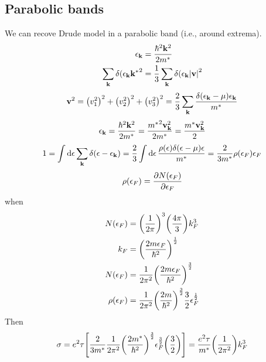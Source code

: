 \subsection{Parabolic bands} We can recove Drude model in a parabolic band (i.e., around extrema). 
\begin{align}
\epsilon_{\vb{k}} &= \frac{\hbar^2 \vb{k}^2 }{2m^*}\\
\sum_{\vb{k}} \delta (\epsilon_{\vb{k}} {\vb{k}^*}^2 &= \frac{1}{3} \sum_{\vb{k}} \delta (\epsilon_{\vb{k}} \abs{\vb{v}}^2
\end{align}
\begin{align}
\vb{v}^2= \qty(v_1^2)^2+\qty(v_2^2)^2+\qty(v_3^2)^2 = \frac{2}{3} \sum_{\vb{k}} \frac{\delta(\epsilon_{\vb{k}}-\mu)\epsilon_{\vb{k}}}{m^*}
\end{align}
\begin{align}
\epsilon_{\vb{k}} = \frac{\hbar^2 \vb{k}^2}{2m^*} = \frac{{m^*}^2 \vb{v}_{\vb{k}}^2}{2m^*} = \frac{{m^*} \vb{v}_{\vb{k}}^2}{2}
\end{align}
\begin{align}
1 = \int \dd{\epsilon } \sum_{\vb{k}} \delta(\epsilon - \epsilon_{\vb{k}}) = \frac{2}{3} \int \dd{\epsilon} \frac{\rho(\epsilon) \delta(\epsilon-\mu) \epsilon }{m^*}= \frac{2}{3m^*} \rho(\epsilon_F)\epsilon_F
\end{align}
\begin{align}
\rho(\epsilon_F) = \pdv{N(\epsilon_F)}{\epsilon_F}
\end{align}
when
\begin{align}
N(\epsilon_F) &= \qty(\frac{1}{2\pi})^3 \qty(\frac{4\pi}{3}) k_F^3\\
k_F &=  \qty(\frac{2m \epsilon_F}{\hbar^2})^{\frac{1}{2}}\\
N(\epsilon_F)  &=  \frac{1}{2\pi^2}\qty(\frac{2m \epsilon_F}{\hbar^2})^{\frac{3}{2}}\\
\rho(\epsilon_F) &= \frac{1}{2\pi^2}\qty(\frac{2m }{\hbar^2})^{\frac{3}{2}}\frac{3}{2}\epsilon_F^{\frac{1}{2}}
\end{align}
Then
\begin{align}
\sigma = e^2 \tau \qty[\frac{2}{3m^*} \frac{1}{2\pi^2} \qty(\frac{2m^*}{\hbar^2})^{\frac{3}{2}} \epsilon_F^{\frac{3}{2}} \qty(\frac{3}{2}) ] = \frac{e^2 \tau}{m^*} \qty(\frac{1}{2\pi^2}) k_F^3
\end{align}